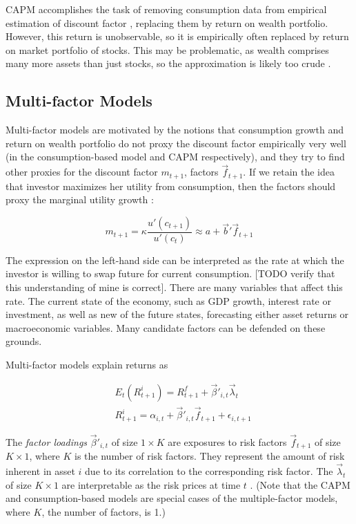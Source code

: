 	 		CAPM accomplishes the task of removing consumption data from empirical estimation of discount factor \citep{cochrane2009asset}, replacing them by return on wealth portfolio. However, this return is unobservable, so it is empirically often replaced by return on market portfolio of stocks. This may be problematic, as wealth comprises many more assets than just stocks, so the approximation is likely too crude \citep{roll1977critique}.  
	 		
	 		
	 	\subsection{Multi-factor Models}
	 		
	 		Multi-factor models are motivated by the notions that consumption growth and return on wealth portfolio do not proxy the discount factor empirically very well (in the consumption-based model and CAPM respectively), and they try to find other proxies for the discount factor $m_{t+1}$, factors $\vec{f}_{t+1}$. If we retain the idea that investor maximizes her utility from consumption, then the factors  should proxy the marginal utility growth \citep{cochrane2009asset}: 
	 		
	 		\begin{equation}
	 		m_{t+1} = \kappa \frac{u'(c_{t+1})}{u'(c_t)} \approx a+\vec{b}'\vec{f}_{t+1}
	 		\end{equation}
	 		
	 		The expression on the left-hand side can be interpreted as the rate at which the investor is willing to swap future for current consumption. [TODO verify that this understanding of mine is correct]. There are many variables that affect this rate. The current state of the economy, such as GDP growth, interest rate or investment, as well as new of the future states, forecasting either asset returns or macroeconomic variables. Many candidate factors can be defended on these grounds.   
	 		
	 		Multi-factor models explain returns as	 
	 	
	 	
			 	\begin{align}
			 		& E_t(R^i_{t+1}) = R^f_{t+1} + \vec{\beta}'_{i,t} \vec{\lambda}_{t} \\
			 		& R^i_{t+1} = \alpha_{i,t} + \vec{\beta}'_{i,t} \vec{f}_{t+1} + \epsilon_{i,t+1} \label{multifactor model}
			 	\end{align}
			 
			 The \textit{factor loadings} $\vec{\beta}'_{i,t}$ of size $1\times K$ are exposures to risk factors $\vec{f}_{t+1}$ of size $K \times 1$, where $K$ is the number of risk factors. They represent the amount of risk inherent in asset $i$ due to its correlation to the corresponding risk factor. The $\vec{\lambda}_{t}$ of size $K \times 1$ are interpretable as the risk prices at time $t$ \citep{kelly2019characteristics}. (Note that the CAPM and consumption-based models are special cases of the multiple-factor models, where $K$, the number of factors, is 1.) 			
			 
